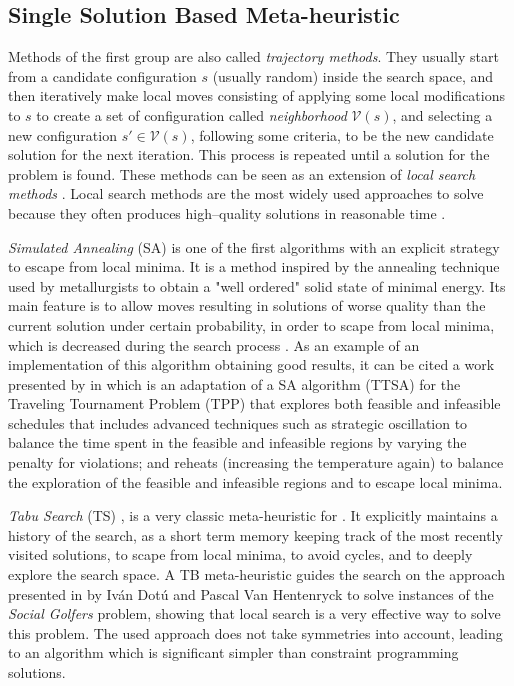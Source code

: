 \subsection{Single Solution Based Meta-heuristic}

Methods of the first group are also called {\it trajectory methods}. They usually start from a candidate configuration $s$ (usually random) inside the search space, and then iteratively make local moves consisting of applying some local modifications to $s$ to create a set of configuration called \textit{neighborhood} $\mathcal{V}\left(s\right)$, and selecting a new configuration $s'\in \mathcal{V}\left(s\right)$, following some criteria, to be the new candidate solution for the next iteration. This process is repeated until a solution for the problem is found. These methods can be seen as an extension of \textit{local search methods} \cite{Boussaid2013}. Local search methods are the most widely used approaches to solve \COPs{} because they often produces high--quality solutions in reasonable time \cite{Voss2012}.
 
{\it Simulated Annealing} (SA) \cite{Nikolaev2010} is one of the first algorithms with an explicit strategy to escape from local minima. It is a method inspired by the annealing technique used by metallurgists to obtain a "well ordered" solid state of minimal energy. Its main feature is to allow moves resulting in solutions of worse quality than the current solution under certain probability, in order to scape from local minima, which is decreased during the search process \cite{Blum2003}. As an example of an implementation of this algorithm obtaining good results, it can be cited a work presented by  in \cite{Anagnostopoulos2006} which is an adaptation of a SA algorithm (TTSA) for the Traveling Tournament Problem (TPP) that explores both feasible and infeasible schedules that includes advanced techniques such as strategic oscillation to balance the time spent in the feasible and infeasible regions by varying the penalty for violations; and reheats (increasing the temperature again) to balance the exploration of the feasible and infeasible regions and to escape local minima.

{\it Tabu Search} (TS) \cite{Gendreau2010}, is a very classic meta-heuristic for \COPs. It explicitly maintains a history of the search, as a short term memory keeping track of the most recently visited solutions, to scape from local minima, to avoid cycles, and to deeply explore the search space. A TB meta-heuristic guides the search on the approach presented in \cite{IvanDotu2007} by Iván Dotú and Pascal Van Hentenryck to solve instances of the \textit{Social Golfers} problem, showing that local search is a very effective way to solve this problem. The used approach does not take symmetries into account, leading to an algorithm which is significant simpler than constraint programming solutions. 

